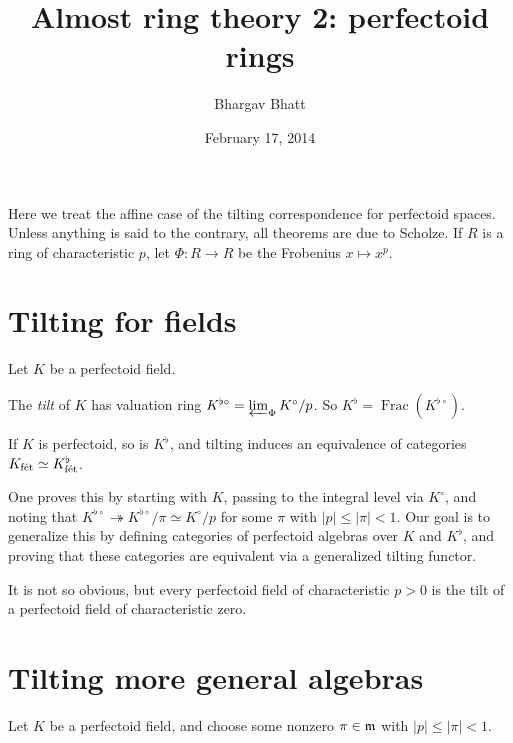 \documentclass{article}
\title{Almost ring theory 2: perfectoid rings}
\author{Bhargav Bhatt}
\date{February 17, 2014}
\begin{document}
\maketitle





Here we treat the affine case of the tilting correspondence for perfectoid 
spaces. Unless anything is said to the contrary, all theorems are due to 
Scholze. If $R$ is a ring of characteristic $p$, let 
$\Phi:R\to R$ be the Frobenius $x\mapsto x^p$. 





\section{Tilting for fields}

Let $K$ be a perfectoid field. 

\begin{definition}
The \emph{tilt} of $K$ has valuation ring 
$K^{\flat\circ} = \varprojlim_\Phi K^\circ/p$. So  
$K^\flat=\operatorname{Frac}(K^{\flat\circ})$. 
\end{definition}

\begin{theorem}
If $K$ is perfectoid, so is $K^\flat$, and tilting induces an equivalence of 
categories $K_{\textnormal{f\'et}}\simeq K_{\textnormal{f\'et}}^\flat$. 
\end{theorem}

One proves this by starting with $K$, passing to the integral level via 
$K^\circ$, and noting 
that $K^{\flat\circ}\twoheadrightarrow K^{\flat\circ}/\pi \simeq K^\circ/p$ for 
some $\pi$ with $|p|\leqslant |\pi|<1$. Our goal is to generalize this by 
defining categories of perfectoid algebras over $K$ and $K^\flat$, and proving 
that these categories are equivalent via a generalized tilting functor. 

It is not so obvious, but every perfectoid field of characteristic $p>0$ is 
the tilt of a perfectoid field of characteristic zero. 





\section{Tilting more general algebras}

Let $K$ be a perfectoid field, and choose some nonzero $\pi\in\mathfrak{m}$ with 
$|p|\leqslant |\pi| < 1$. 
\end{document}
